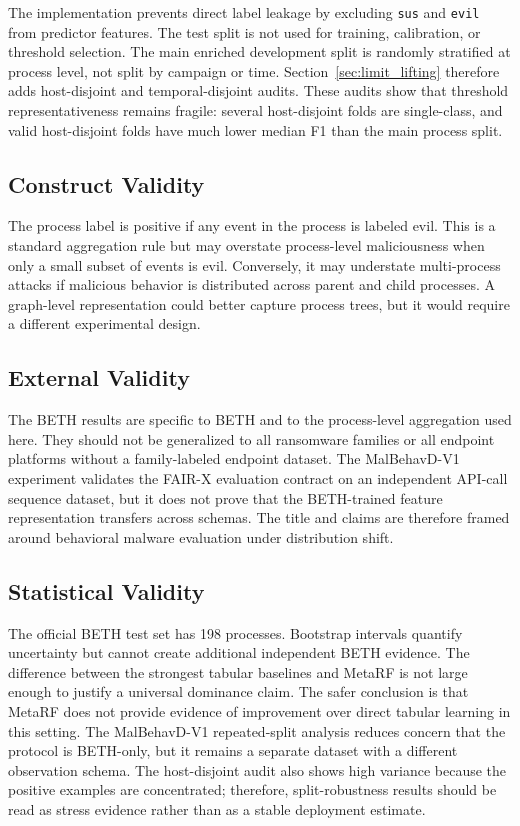 \documentclass[10pt,journal,compsoc]{IEEEtran}
\begin{document}
The implementation prevents direct label leakage by excluding \texttt{sus} and \texttt{evil} from predictor features. The test split is not used for training, calibration, or threshold selection. The main enriched development split is randomly stratified at process level, not split by campaign or time. Section~\ref{sec:limit_lifting} therefore adds host-disjoint and temporal-disjoint audits. These audits show that threshold representativeness remains fragile: several host-disjoint folds are single-class, and valid host-disjoint folds have much lower median F1 than the main process split.

\subsection{Construct Validity}

The process label is positive if any event in the process is labeled evil. This is a standard aggregation rule but may overstate process-level maliciousness when only a small subset of events is evil. Conversely, it may understate multi-process attacks if malicious behavior is distributed across parent and child processes. A graph-level representation could better capture process trees, but it would require a different experimental design.

\subsection{External Validity}

The BETH results are specific to BETH and to the process-level aggregation used here. They should not be generalized to all ransomware families or all endpoint platforms without a family-labeled endpoint dataset. The MalBehavD-V1 experiment validates the FAIR-X evaluation contract on an independent API-call sequence dataset, but it does not prove that the BETH-trained feature representation transfers across schemas. The title and claims are therefore framed around behavioral malware evaluation under distribution shift.

\subsection{Statistical Validity}

The official BETH test set has 198 processes. Bootstrap intervals quantify uncertainty but cannot create additional independent BETH evidence. The difference between the strongest tabular baselines and MetaRF is not large enough to justify a universal dominance claim. The safer conclusion is that MetaRF does not provide evidence of improvement over direct tabular learning in this setting. The MalBehavD-V1 repeated-split analysis reduces concern that the protocol is BETH-only, but it remains a separate dataset with a different observation schema. The host-disjoint audit also shows high variance because the positive examples are concentrated; therefore, split-robustness results should be read as stress evidence rather than as a stable deployment estimate.
\end{document}
